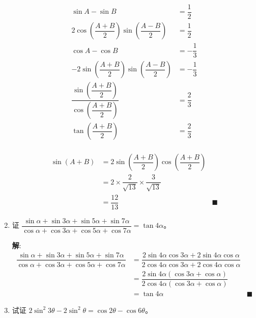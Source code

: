 \documentclass{report}
\newcommand{\sol}{\vspace{0.2cm}\textbf{解}:}
\begin{document}
\begin{enumerate}[leftmargin=*]
    \begin{align*}
        \sin A - \sin B &= \dfrac{1}{2} \\
        2\cos\left(\dfrac{A+B}{2}\right)\sin\left(\dfrac{A-B}{2}\right) &= \dfrac{1}{2} \\
        \cos A - \cos B &= -\dfrac{1}{3} \\
        -2\sin\left(\dfrac{A+B}{2}\right)\sin\left(\dfrac{A-B}{2}\right) &= -\dfrac{1}{3} \\
        \dfrac{\sin\left(\dfrac{A+B}{2}\right)}{\cos\left(\dfrac{A+B}{2}\right)} &= \dfrac{2}{3} \\
        \tan\left(\dfrac{A+B}{2}\right) &= \dfrac{2}{3} \\
    \end{align*}
    \begin{center}
    \end{center}
    \begin{align*}
        \sin(A+B) &= 2\sin\left(\dfrac{A+B}{2}\right)\cos\left(\dfrac{A+B}{2}\right) \\
        & = 2 \times \dfrac{2}{\sqrt{13}} \times \dfrac{3}{\sqrt{13}} \\
        & = \dfrac{12}{13} &\blacksquare
    \end{align*}

    \item 证 $\dfrac{\sin \alpha+\sin 3 \alpha+\sin 5 \alpha+\sin 7 \alpha}{\cos \alpha+\cos 3 \alpha+\cos 5 \alpha+\cos 7 \alpha}=\tan 4 \alpha$。
    
    \sol{}
    \begin{align*}
        \dfrac{\sin \alpha+\sin 3 \alpha+\sin 5 \alpha+\sin 7 \alpha}{\cos \alpha+\cos 3 \alpha+\cos 5 \alpha+\cos 7 \alpha} &= \dfrac{2\sin 4\alpha\cos 3\alpha + 2\sin 4\alpha\cos \alpha}{2\cos 4\alpha\cos 3\alpha + 2\cos 4\alpha\cos \alpha} \\
        & = \dfrac{2\sin 4\alpha(\cos 3\alpha + \cos \alpha)}{2\cos 4\alpha(\cos 3\alpha + \cos \alpha)} \\
        & = \tan 4\alpha &\blacksquare
    \end{align*}

    \item 试证 $2 \sin ^2 3 \theta-2 \sin ^2 \theta=\cos 2 \theta-\cos 6 \theta$。
    

\end{enumerate}
\end{document}
